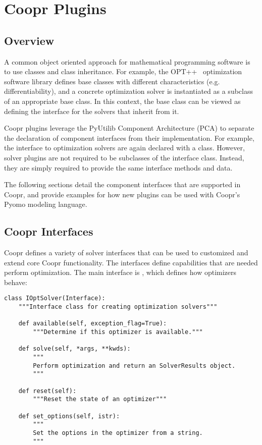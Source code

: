 
\chapter{Coopr Plugins}

\label{chap:coopr}


\section{Overview}

A common object oriented approach for mathematical programming software is
to use classes and class inheritance.  For example, the OPT++~\cite{Mez94}
optimization software library defines base classes with different
characteristics (e.g. differentiability), and a concrete optimization
solver is instantiated as a subclass of an appropriate base class.  In this
context, the base class can be viewed as defining the interface for the 
solvers that inherit from it.

Coopr plugins leverage the PyUtilib Component Architecture
(PCA) to separate the declaration of component interfaces from
their implementation.  For example, the interface to optimization solvers
are again declared with a class.  However, solver plugins are not required to
be subclasses of the interface class.  Instead, they are simply required to 
provide the same interface methods and data.  

The following sections detail the component interfaces that are supported in
Coopr, and provide examples for how new plugins can be used with Coopr's 
Pyomo modeling language.


\section{Coopr Interfaces}

Coopr defines a variety of solver interfaces that can be used to
customized and extend core Coopr functionality.  The 
interfaces define capabilities that are needed perform optimization.  The main
interface is , which defines how optimizers behave:
\begin{lstlisting}
class IOptSolver(Interface):
    """Interface class for creating optimization solvers"""

    def available(self, exception_flag=True):
        """Determine if this optimizer is available."""

    def solve(self, *args, **kwds):
        """
        Perform optimization and return an SolverResults object.
        """

    def reset(self):
        """Reset the state of an optimizer"""

    def set_options(self, istr):
        """
        Set the options in the optimizer from a string.
        """
\end{lstlisting}

